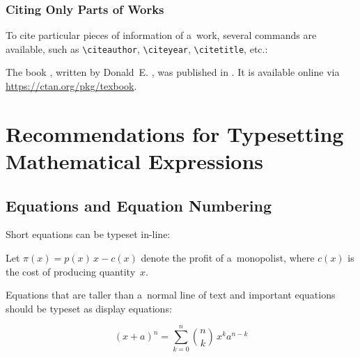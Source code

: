 \subsubsection{Citing Only Parts of Works}
To cite particular pieces of information of a~work, several commands are available, such as \verb|\citeauthor|, \verb|\citeyear|, \verb|\citetitle|, etc.:
\begin{longtblr}{}
	The book , written by Donald~E. \citeauthor{knuth:ct:a}, was published in \citeyear{knuth:ct:a}. It is available online via  \url{https://ctan.org/pkg/texbook}.%
\end{longtblr}


\section{Recommendations for Typesetting Mathematical Expressions}
\label{sec:math}

\subsection{Equations and Equation Numbering}
Short equations can be typeset in-line:
\begin{longtblr}{}
	Let $\pi(x) = p(x)\,x - c(x)$ denote the profit of a~monopolist, where $c(x)$ is the cost of producing quantity~$x$.
\end{longtblr}

Equations that are taller than a~normal line of text and important equations should be typeset as display equations:
\begin{longtblr}{}
	\begin{minipage}{\linewidth}\noindent%
		\begin{equation}
			(x+a)^n= \sum_{k=0}^n \binom{n}{k} \, x^k a^{n-k}
		\end{equation}%
	\end{minipage}\vspace{0.333\smallskipamount}
\end{longtblr}

